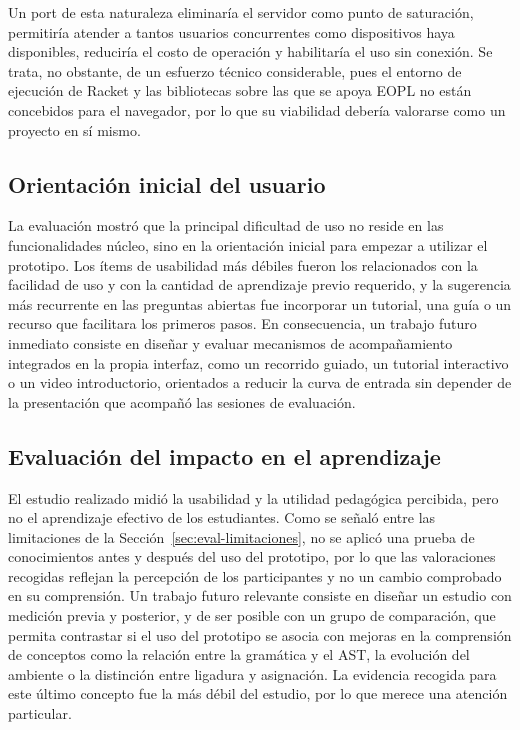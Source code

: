 Un port de esta naturaleza eliminaría el servidor como punto de saturación, permitiría atender a tantos usuarios concurrentes como dispositivos haya disponibles, reduciría el costo de operación y habilitaría el uso sin conexión. Se trata, no obstante, de un esfuerzo técnico considerable, pues el entorno de ejecución de Racket y las bibliotecas sobre las que se apoya EOPL no están concebidos para el navegador, por lo que su viabilidad debería valorarse como un proyecto en sí mismo.

\subsection{Orientación inicial del usuario}

La evaluación mostró que la principal dificultad de uso no reside en las funcionalidades núcleo, sino en la orientación inicial para empezar a utilizar el prototipo. Los ítems de usabilidad más débiles fueron los relacionados con la facilidad de uso y con la cantidad de aprendizaje previo requerido, y la sugerencia más recurrente en las preguntas abiertas fue incorporar un tutorial, una guía o un recurso que facilitara los primeros pasos. En consecuencia, un trabajo futuro inmediato consiste en diseñar y evaluar mecanismos de acompañamiento integrados en la propia interfaz, como un recorrido guiado, un tutorial interactivo o un video introductorio, orientados a reducir la curva de entrada sin depender de la presentación que acompañó las sesiones de evaluación.

\subsection{Evaluación del impacto en el aprendizaje}

El estudio realizado midió la usabilidad y la utilidad pedagógica percibida, pero no el aprendizaje efectivo de los estudiantes. Como se señaló entre las limitaciones de la Sección~\ref{sec:eval-limitaciones}, no se aplicó una prueba de conocimientos antes y después del uso del prototipo, por lo que las valoraciones recogidas reflejan la percepción de los participantes y no un cambio comprobado en su comprensión. Un trabajo futuro relevante consiste en diseñar un estudio con medición previa y posterior, y de ser posible con un grupo de comparación, que permita contrastar si el uso del prototipo se asocia con mejoras en la comprensión de conceptos como la relación entre la gramática y el AST, la evolución del ambiente o la distinción entre ligadura y asignación. La evidencia recogida para este último concepto fue la más débil del estudio, por lo que merece una atención particular.